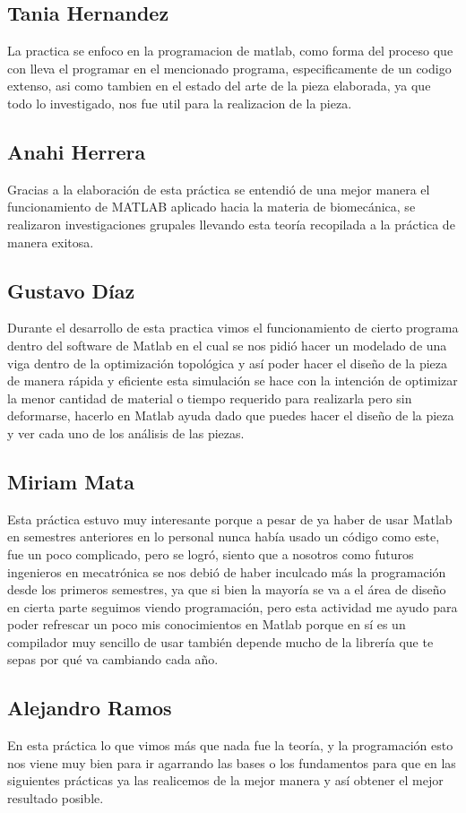 \documentclass{article}
\begin{document}
\subsection{Tania  Hernandez}
La practica se enfoco en la programacion de matlab, como forma del proceso que con lleva el programar en el mencionado programa, especificamente de un codigo extenso, asi como tambien en el estado del arte de la pieza elaborada, ya que todo lo investigado, nos fue util para la realizacion de la pieza.
\subsection{Anahi Herrera}
Gracias a la elaboración de esta práctica se entendió de una mejor manera el funcionamiento de MATLAB aplicado hacia la materia de biomecánica, se realizaron investigaciones grupales llevando esta teoría recopilada a la práctica de manera exitosa. 
\subsection{Gustavo  Díaz}
Durante el desarrollo de esta practica vimos el funcionamiento de cierto programa dentro del software de Matlab en el cual se nos pidió hacer un modelado de una viga dentro de la optimización topológica y así poder hacer el diseño de la pieza de manera rápida y eficiente esta simulación se hace con la intención de optimizar la menor cantidad de material o tiempo requerido para realizarla pero sin deformarse, hacerlo en Matlab ayuda dado que puedes hacer el diseño de la pieza y ver cada uno de los análisis de las piezas.
\subsection{Miriam  Mata}
Esta práctica estuvo muy interesante porque a pesar de ya haber de usar Matlab en semestres anteriores en lo personal nunca había usado un código como este, fue un poco complicado, pero se logró, siento que a nosotros como futuros ingenieros en mecatrónica se nos debió de haber inculcado más la programación desde los primeros semestres, ya que si bien la mayoría se va a el área de diseño en cierta parte seguimos viendo programación, pero esta actividad me ayudo para poder refrescar un poco mis conocimientos en Matlab porque en sí es un compilador muy sencillo de usar también depende mucho de la librería que te sepas por qué va cambiando cada año.
\subsection{Alejandro Ramos}
En esta práctica lo que vimos más que nada fue la teoría, y la programación esto nos viene muy bien para ir agarrando las bases o los fundamentos para que en las siguientes prácticas ya las realicemos de la mejor manera y así obtener el mejor resultado posible.
\newpage


\end{document}
